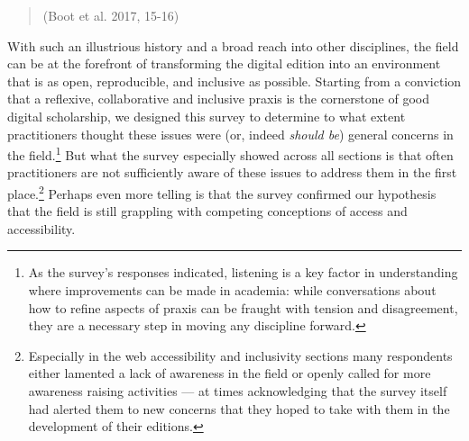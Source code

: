 \begin{paper}
\begin{quote}
\begin{flushright}(Boot et al. 2017, 15-16)\end{flushright}
\end{quote}

With such an illustrious history and a broad reach into other
disciplines, the field can be at the forefront of transforming the
digital edition into an environment that is as open, reproducible, and
inclusive as possible. Starting from a conviction that a reflexive,
collaborative and inclusive praxis is the cornerstone of good digital
scholarship, we designed this survey to determine to what extent
practitioners thought these issues were (or, indeed \emph{should be})
general concerns in the field.\footnote{As the survey's responses
  indicated, listening is a key factor in understanding where
  improvements can be made in academia: while conversations about how to
  refine aspects of praxis can be fraught with tension and disagreement,
  they are a necessary step in moving any discipline forward.} But what
the survey especially showed across all sections is that often
practitioners are not sufficiently aware of these issues to address them
in the first place.\footnote{Especially in the web accessibility and
  inclusivity sections many respondents either lamented a lack of
  awareness in the field or openly called for more awareness raising
  activities --- at times acknowledging that the survey itself had
  alerted them to new concerns that they hoped to take with them in the
  development of their editions.} Perhaps even more telling is that the
survey confirmed our hypothesis that the field is still grappling with
competing conceptions of access and accessibility.


\end{paper}
